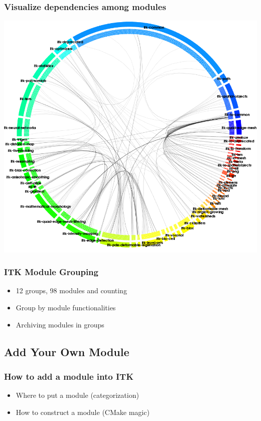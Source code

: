 \begin{frame}
\frametitle{Visualize dependencies among modules}
\center
\begin{center}
\includegraphics[height=0.8\textheight]{../Art/moduleDependency.png}
\end{center}
\end{frame}

\begin{frame}
\frametitle{ITK Module Grouping}
\begin{itemize}
\item  12 groups, 98 modules and counting
\pause
\item  Group by module functionalities
\pause
\item  Archiving modules in groups
\pause
\end{itemize}
\end{frame}

\subsection{Add Your Own Module}

\begin{frame}
\frametitle{How to add a module into ITK}
\begin{itemize}
\item Where to put a module (categorization)
\pause
\item How to construct a module (CMake magic)
\end{itemize}
\end{frame}


